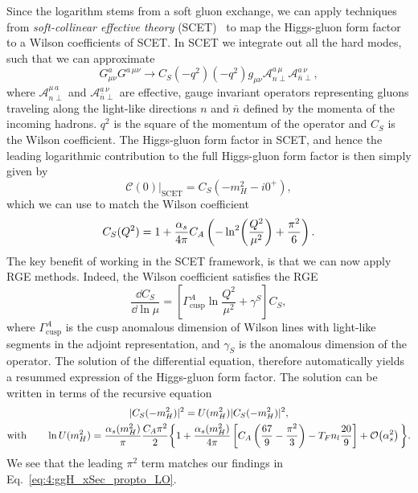 Since the logarithm stems from a soft gluon exchange, we can apply techniques from \textit{soft-collinear effective theory} (\acs{SCET})~\cite{Bauer:2001yt, Bauer:2002nz} to map the Higgs-gluon form factor to a Wilson coefficients of \acs{SCET}. In \acs{SCET} we integrate out all the hard modes, such that we can approximate
\begin{equation}
G_{\mu \nu}^a G^{a\, \mu \nu} \longrightarrow C_S (-q^2) (-q^2) g_{\mu \nu} \mathcal{A}_{n \perp}^{a \, \mu} \mathcal{A}_{\bar{n}\perp}^{a \, \nu},
\end{equation}
where $\mathcal{A}_{n \perp}^{\mu\, a}$ and $\mathcal{A}_{\bar{n}\perp}^{a \, \nu}$ are effective, gauge invariant operators representing gluons traveling along the light-like directions $n$ and $\bar{n}$ defined by the momenta of the incoming hadrons. $q^2$ is the square of the momentum of the operator and $C_S$ is the Wilson coefficient. The Higgs-gluon form factor in \acs{SCET}, and hence the leading logarithmic contribution to the full Higgs-gluon form factor is then simply given by 
\begin{equation}
\mathcal{C}(0) \Big \vert_{\mathrm{SCET}} = C_S (-m_H^2 - i 0^+),
\end{equation}
which we can use to match the Wilson coefficient
\begin{equation}
C_S(Q^2) = 1 + \frac{\alpha_s}{4 \pi} C_A \left( - \ln^2\!\left(\frac{Q^2}{\mu^2}\right) + \frac{\pi^2}{6} \right).
\end{equation}
The key benefit of working in the \acs{SCET} framework, is that we can now apply \acs{RGE} methods. Indeed, the Wilson coefficient satisfies the \acs{RGE}
\begin{equation}
\frac{\dd C_S}{\dd \ln \mu} = \left[ \Gamma^A_{\mathrm{cusp}} \ln \frac{Q^2}{\mu^2} + \gamma^S \right] C_S,
\end{equation}
where $\Gamma^A_{\mathrm{cusp}}$ is the cusp anomalous dimension of Wilson lines with light-like segments in the adjoint representation, and $\gamma_S$ is the anomalous dimension of the operator. The solution of the differential equation, therefore automatically yields a resummed expression of the Higgs-gluon form factor. The solution can be written in terms of the recursive equation
\begin{equation}
\begin{gathered}
|C_S(-m_H^2)|^2 = U(m_H^2) |C_S(-m_H^2)|^2,  \\
\text{with} \qquad \ln U(m_H^2) = \frac{\alpha_s (m_H^2)}{\pi}\frac{C_A \pi^2 }{2} \bigg \lbrace 1 + \frac{\alpha_s(m_H^2)}{4 \pi} \left[C_A \left(\frac{67}{9} - \frac{\pi^2}{3} \right) - T_F n_l \frac{20}{9} \right] + \mathcal{O}\!\left(\alpha_s^2\right) \bigg \rbrace.
\end{gathered}
\end{equation}
We see that the leading $\pi^2$ term matches our findings in Eq.~\eqref{eq:4:ggH_xSec_propto_LO}.

